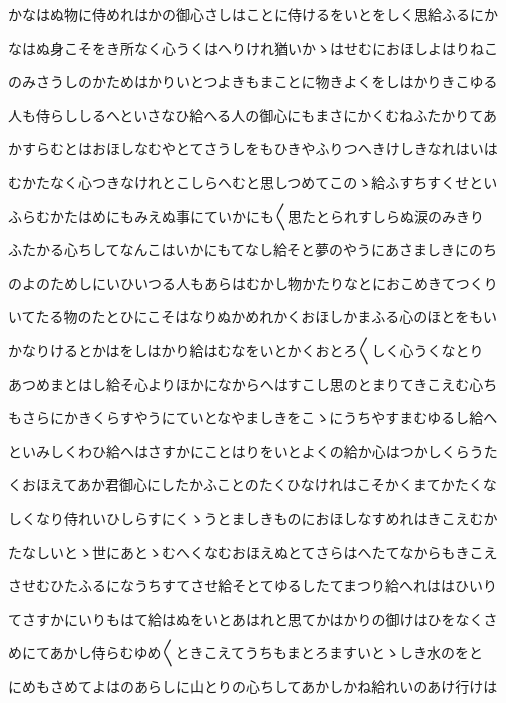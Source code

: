\documentclass[a4paper,11pt,landscape]{ltjtarticle}
\begin{document}
\par\medskip
かなはぬ物に侍めれはかの御心さしはことに侍けるをいとをしく思給ふるにか
\par\medskip
なはぬ身こそをき所なく心うくはへりけれ猶いかゝはせむにおほしよはりねこ
\par\medskip
のみさうしのかためはかりいとつよきもまことに物きよくをしはかりきこゆる
\par\medskip
人も侍らししるへといさなひ給へる人の御心にもまさにかくむねふたかりてあ
\par\medskip
かすらむとはおほしなむやとてさうしをもひきやふりつへきけしきなれはいは
\par\medskip
むかたなく心つきなけれとこしらへむと思しつめてこのゝ給ふすちすくせとい
\par\medskip
ふらむかたはめにもみえぬ事にていかにも〱思たとられすしらぬ涙のみきり
\par\medskip
ふたかる心ちしてなんこはいかにもてなし給そと夢のやうにあさましきにのち
\par\medskip
のよのためしにいひいつる人もあらはむかし物かたりなとにおこめきてつくり
\par\medskip
いてたる物のたとひにこそはなりぬかめれかくおほしかまふる心のほとをもい
\par\medskip
かなりけるとかはをしはかり給はむなをいとかくおとろ〱しく心うくなとり
\par\medskip
あつめまとはし給そ心よりほかになからへはすこし思のとまりてきこえむ心ち
\par\medskip
もさらにかきくらすやうにていとなやましきをこゝにうちやすまむゆるし給へ
\par\medskip
といみしくわひ給へはさすかにことはりをいとよくの給か心はつかしくらうた
\par\medskip
くおほえてあか君御心にしたかふことのたくひなけれはこそかくまてかたくな
\par\medskip
しくなり侍れいひしらすにくゝうとましきものにおほしなすめれはきこえむか
\par\medskip
たなしいとゝ世にあとゝむへくなむおほえぬとてさらはへたてなからもきこえ
\par\medskip
させむひたふるになうちすてさせ給そとてゆるしたてまつり給へれははひいり
\par\medskip
てさすかにいりもはて給はぬをいとあはれと思てかはかりの御けはひをなくさ
\par\medskip
めにてあかし侍らむゆめ〱ときこえてうちもまとろますいとゝしき水のをと
\par\medskip
にめもさめてよはのあらしに山とりの心ちしてあかしかね給れいのあけ行けは
\par\medskip
\end{document}
